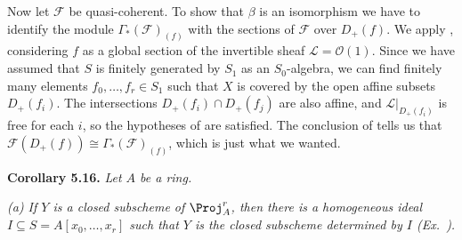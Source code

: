 {Now let $\mathcal F$ be quasi-coherent. To show that $\beta$ is an isomorphism we have to identify the module $\Gamma_*(\mathcal F)_{(f)}$ with the sections of $\mathcal F$ over $D_+(f)$. We apply , considering $f$ as a global section of the invertible sheaf $\mathcal L=\mathcal O(1)$. Since we have assumed that $S$ is finitely generated by $S_1$ as an $S_0$-algebra, we can find finitely many elements $f_0,\ldots,f_r\in S_1$ such that $X$ is covered by the open affine subsets $D_+(f_i)$. The intersections $D_+(f_i)\cap D_+(f_j)$ are also affine, and $\mathcal L|_{D_+(f_i)}$ is free for each $i$, so the hypotheses of  are satisfied. The conclusion of  tells us that $\mathcal F(D_+(f))\cong\Gamma_*(\mathcal F)_{(f)}$, which is just what we wanted.

\medskip
\noindent\hypertarget{result-II-5.16}{}\textbf{Corollary 5.16.} \emph{Let $A$ be a ring.}
\par{\itshape\leftskip=12pt
\hypertarget{result-II-5.16a}{}(a) If $Y$ is a closed subscheme of $\Proj_A^r$, then there is a homogeneous ideal $I\subseteq S=A[x_0,\ldots,x_r]$ such that $Y$ is the closed subscheme determined by $I$ (Ex.~).\par}
}
